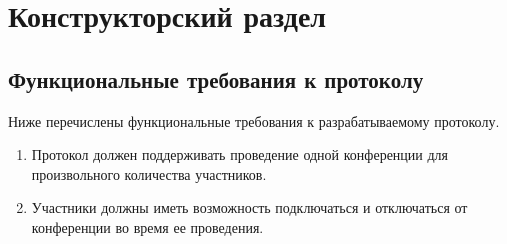 \chapter{Конструкторский раздел}




\section{Функциональные требования к протоколу}

Ниже перечислены функциональные требования к разрабатываемому протоколу.

\begin{enumerate}
    \item Протокол должен поддерживать проведение одной конференции для произвольного количества участников.
    \item Участники должны иметь возможность подключаться и отключаться от конференции во время ее проведения.
\end{enumerate}






